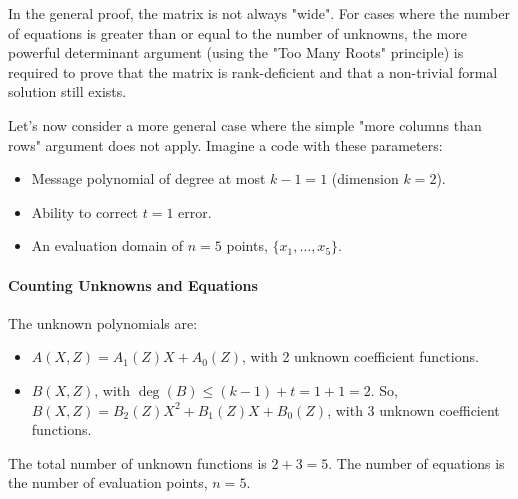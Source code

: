 \documentclass{article}
\begin{document}
\begin{tcolorbox}[breakable, title={Illustration: A Small Example of the Matrix $\mathbf{M}(Z)$}]
In the general proof, the matrix is not always "wide". For cases where the number of equations is greater than or equal to the number of unknowns, the more powerful determinant argument (using the "Too Many Roots" principle) is required to prove that the matrix is rank-deficient and that a non-trivial formal solution still exists.
\end{tcolorbox}



\begin{tcolorbox}[breakable, title={Example: The General Case (A "Tall" or Square Matrix)}]
Let's now consider a more general case where the simple "more columns than rows" argument does not apply. Imagine a code with these parameters:
\begin{itemize}
    \item Message polynomial of degree at most $k-1=1$ (dimension $k=2$).
    \item Ability to correct $t=1$ error.
    \item An evaluation domain of $n=5$ points, $\{x_1, \dots, x_5\}$.
\end{itemize}

\paragraph{Counting Unknowns and Equations}
The unknown polynomials are:
\begin{itemize}
    \item $A(X,Z) = A_1(Z)X + A_0(Z)$, with 2 unknown coefficient functions.
    \item $B(X,Z)$, with $\deg(B) \le (k-1)+t = 1+1=2$. So, $B(X,Z) = B_2(Z)X^2 + B_1(Z)X + B_0(Z)$, with 3 unknown coefficient functions.
\end{itemize}
The total number of unknown functions is $2+3=5$. The number of equations is the number of evaluation points, $n=5$.


\end{tcolorbox}
\end{document}

